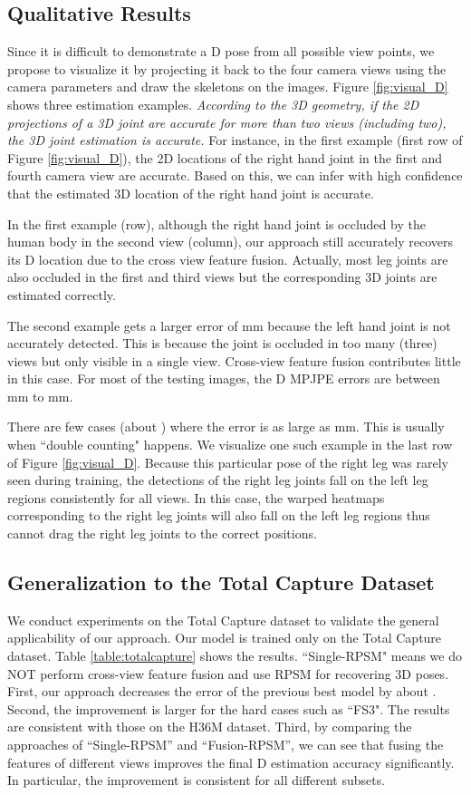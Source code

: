 \documentclass[10pt,twocolumn,letterpaper]{article}
\begin{document}
\subsection{Qualitative Results}
Since it is difficult to demonstrate a D pose from all possible view points, we propose to visualize it by projecting it back to the four camera views using the camera parameters and draw the skeletons on the images.
Figure \ref{fig:visual_D} shows three estimation examples.
\emph{According to the 3D geometry, if the 2D projections of a 3D joint are accurate for more than two views (including two), the 3D joint estimation is accurate.} For instance, in the first example (first row of Figure \ref{fig:visual_D}), the 2D locations of the right hand joint in the first and fourth camera view are accurate. Based on this, we can infer with high confidence that the estimated 3D location of the right hand joint is accurate.

 In the first example (row), although the right hand joint is occluded by the human body in the second view (column), our approach still accurately recovers its D location due to the cross view feature fusion. Actually, most leg joints are also occluded in the first and third views but the corresponding 3D joints are estimated correctly. 
 
 The second example gets a larger error of mm because the left hand joint is not accurately detected. This is because the joint is occluded in too many (three) views but only visible in a single view. Cross-view feature fusion contributes little in this case. For most of the testing images, the D MPJPE errors are between mm to mm. 
 
 There are few cases (about ) where the error is as large as mm. This is usually when ``double counting" happens. We visualize one such example in the last row of Figure \ref{fig:visual_D}.  Because this particular pose of the right leg was rarely seen during training, the detections of the right leg joints fall on the left leg regions consistently for all views. In this case, the warped heatmaps corresponding to the right leg joints will also fall on the left leg regions thus cannot drag the right leg joints to the correct positions.


\subsection{Generalization to the Total Capture Dataset}
We conduct experiments on the Total Capture dataset to validate the general applicability of our approach. Our model is trained only on the Total Capture dataset. Table \ref{table:totalcapture} shows the results. ``Single-RPSM" means we do NOT perform cross-view feature fusion and use RPSM for recovering 3D poses. 
 First, our approach decreases the error of the previous best model \cite{trumble2018deep} by about . Second, the improvement is larger for the hard cases such as ``FS3". The results are consistent with those on the H36M dataset. Third, by comparing the approaches of ``Single-RPSM'' and ``Fusion-RPSM'', we can see that fusing the features of different views improves the final D estimation accuracy significantly. In particular, the improvement is consistent for all different subsets.
\end{document}
